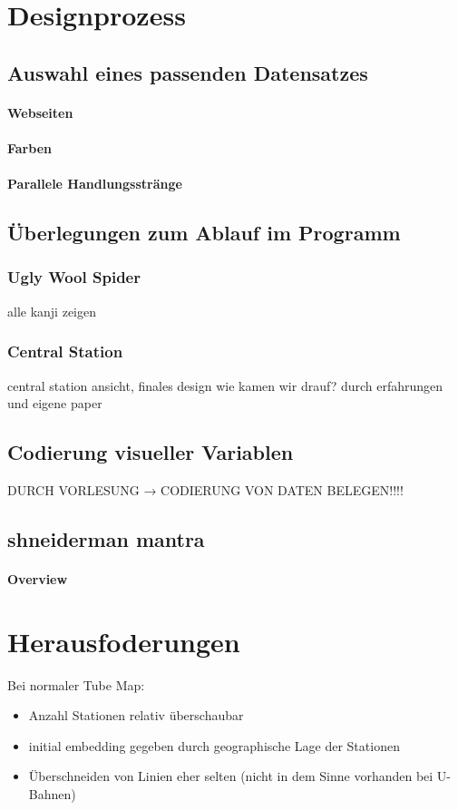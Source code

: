 \documentclass[color,german]{tudbook}
\begin{document}
\chapter{Designprozess}
\section{Auswahl eines passenden Datensatzes}
\subsubsection{Webseiten}
\subsubsection{Farben}
\subsubsection{Parallele Handlungsstränge}

\section{Überlegungen zum Ablauf im Programm}
\subsection{Ugly Wool Spider}
alle kanji zeigen

\subsection{Central Station}
central station ansicht, finales design
wie kamen wir drauf? durch erfahrungen und eigene paper

\section{Codierung visueller Variablen}
DURCH VORLESUNG → CODIERUNG VON DATEN BELEGEN!!!!

\section{shneiderman mantra}
\subsubsection{Overview}
\chapter{Herausfoderungen}
Bei normaler Tube Map:
\begin{itemize}
\item Anzahl Stationen relativ überschaubar
\item initial embedding gegeben durch geographische Lage der Stationen
\item Überschneiden von Linien eher selten (nicht in dem Sinne vorhanden bei U-Bahnen)
\end{itemize}
\end{document}
